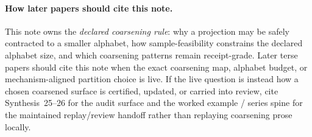 \documentclass[11pt]{article}
\begin{document}
\paragraph{How later papers should cite this note.}
This note owns the \emph{declared coarsening rule}: why a projection may be safely contracted to a smaller alphabet, how sample-feasibility constrains the declared alphabet size, and which coarsening patterns remain receipt-grade. Later terse papers should cite this note when the exact coarsening map, alphabet budget, or mechanism-aligned partition choice is live. If the live question is instead how a chosen coarsened surface is certified, updated, or carried into review, cite Synthesis~25--26 for the audit surface and the worked example / series spine for the maintained replay/review handoff rather than replaying coarsening prose locally.\cite{series:workedexample,series:seriesspines}
\end{document}
